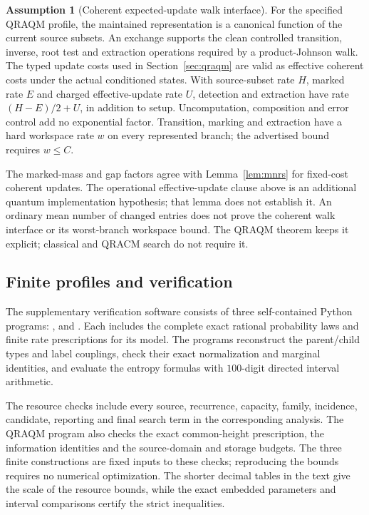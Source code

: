 \documentclass[10pt,a4paper]{article}
\theoremstyle{definition}
\newtheorem{assumption}[theorem]{Assumption}
\begin{document}
\begin{assumption}[Coherent expected-update walk interface]
\label{ass:updates}
For the specified QRAQM profile, the maintained representation is a
canonical function of the current source subsets. An exchange supports
the clean controlled transition, inverse, root test and extraction
operations required by a product-Johnson walk. The typed update costs
used in Section~\ref{sec:qraqm} are valid as effective coherent costs
under the actual conditioned states. With source-subset rate $H$,
marked rate $E$ and charged effective-update rate $U$, detection and
extraction have rate $(H-E)/2+U$, in addition to setup.
Uncomputation, composition and error control add no exponential factor.
Transition, marking and extraction have a hard workspace rate $w$ on
every represented branch; the advertised bound requires $w\le C$.
\end{assumption}
The marked-mass and gap factors agree with Lemma~\ref{lem:mnrs} for fixed-cost coherent updates. The operational effective-update clause above is an additional quantum implementation hypothesis; that lemma does not establish it. An ordinary
mean number of changed entries does not prove the coherent walk
interface or its worst-branch workspace bound. The QRAQM theorem keeps
it explicit; classical and QRACM search do not require it.

\subsection{Finite profiles and verification}
The supplementary verification software consists of three self-contained
Python programs: ,  and
. Each includes the complete exact rational
probability laws and finite rate prescriptions for its model. The
programs reconstruct the parent/child types and label couplings, check
their exact normalization and marginal identities, and evaluate the
entropy formulas with $100$-digit directed interval arithmetic.

The resource checks include every source, recurrence, capacity, family,
incidence, candidate, reporting and final search term in the corresponding
analysis. The QRAQM program also checks the exact common-height
prescription, the information identities and the source-domain and
storage budgets. The three finite constructions are fixed inputs to
these checks; reproducing the bounds requires no numerical optimization.
The shorter decimal tables in the text give the scale of the resource
bounds, while the exact embedded parameters and interval comparisons
certify the strict inequalities.
\end{document}
